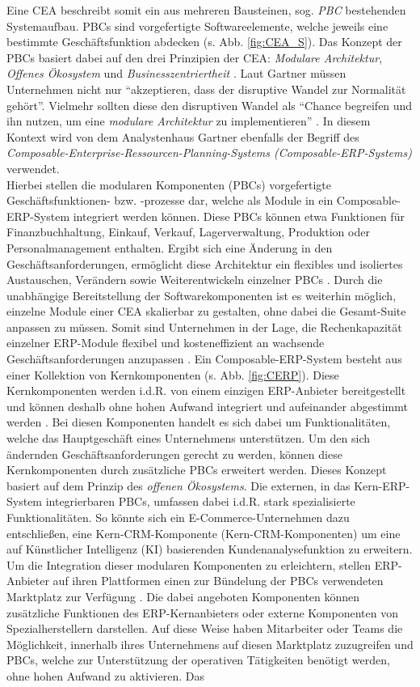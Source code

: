 Eine CEA beschreibt somit ein aus mehreren Bausteinen, sog. \textit{\ac{PBC}} bestehenden Systemaufbau. PBCs sind vorgefertigte Softwareelemente, welche jeweils eine bestimmte Geschäftsfunktion abdecken (s. Abb. \ref{fig:CEA_S}). Das Konzept der PBCs basiert dabei auf den drei Prinzipien der CEA: \textit{Modulare Architektur}, \textit{Offenes Ökosystem} und \textit{Businesszentriertheit} \cite{.20230313}. Laut Gartner müssen Unternehmen nicht nur \enquote{akzeptieren, dass der disruptive Wandel zur Normalität gehört}. Vielmehr sollten diese den disruptiven Wandel als \enquote{Chance begreifen und ihn nutzen, um eine \textit{modulare Architektur} zu implementieren} \cite{.20230313}. In diesem Kontext wird von dem Analystenhaus Gartner ebenfalls der Begriff des \textit{Composable-Enterprise-Ressourcen-Planning-Systems (Composable-\acs{ERP}-Systems)} verwendet. \\Hierbei stellen die modularen Komponenten (PBCs) vorgefertigte Geschäftsfunktio\-nen- bzw. -prozesse dar, welche als Module in ein Composable-ERP-System integriert werden können. Diese PBCs können etwa Funktionen für Finanzbuchhaltung, Einkauf, Verkauf, Lagerverwaltung, Produktion oder Personalmanagement enthalten. Ergibt sich eine Änderung in den Geschäftsanforderungen, ermöglicht diese Architektur ein flexibles und isoliertes Austauschen, Verändern sowie Weiterentwickeln einzelner PBCs \cite{Gartner.20230418}. Durch die unabhängige Bereitstellung der Softwarekomponenten ist es weiterhin möglich, einzelne Module einer CEA skalierbar zu gestalten, ohne dabei die Gesamt-Suite anpassen zu müssen. Somit sind Unternehmen in der Lage, die Rechenkapazität einzelner ERP-Module flexibel und kosteneffizient an wachsende Geschäftsanforderungen anzupassen \cite[7]{Sensedia.2020}. Ein Composable-ERP-System besteht aus einer Kollektion von Kernkomponenten (s. Abb. \ref{fig:CERP}). Diese Kernkomponenten werden i.d.R. von einem einzigen ERP-Anbieter bereitgestellt und können deshalb ohne hohen Aufwand integriert und aufeinander abgestimmt werden \cite{.d}. Bei diesen Komponenten handelt es sich dabei um Funktionalitäten, welche das Hauptgeschäft eines Unternehmens unterstützen. Um den sich ändernden Geschäftsanforderungen gerecht zu werden, können diese Kernkomponenten durch zusätzliche PBCs erweitert werden. Dieses Konzept basiert auf dem Prinzip des \textit{offenen Ökosystems}. Die externen, in das Kern-ERP-System integrierbaren PBCs, umfassen dabei i.d.R. stark spezialisierte Funktionalitäten. So könnte sich ein E-Commerce-Unternehmen dazu entschließen, eine Kern-\acl{CRM}-Komponente (Kern-CRM-Komponenten) um eine auf Kün\-stlicher Intelligenz (\acs{KI}) basierenden Kundenanalysefunktion zu erweitern. Um die Integration dieser modularen Komponenten zu erleichtern, stellen ERP-Anbieter auf ihren Plattformen einen zur Bündelung der PBCs verwendeten Marktplatz zur Verfügung \cite{.d}. Die dabei angeboten Komponenten können zusätzliche Funktionen des ERP-Kern\-anbieters oder externe Komponenten von Spezialherstellern darstellen. Auf diese Weise haben Mitarbeiter oder Teams die Möglichkeit, innerhalb ihres Unternehmens auf diesen Marktplatz zuzugreifen und PBCs, welche zur Unterstützung der operativen Tätigkeiten benötigt werden, ohne hohen Aufwand zu aktivieren. Das 